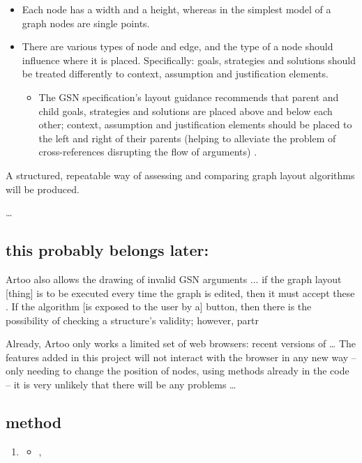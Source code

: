 \begin{itemize}
  \item
    Each node has a width and a height, whereas in the simplest model of a graph nodes are single points. 
  \item
    There are various types of node and edge, and the type of a node should influence where it is placed. Specifically: goals, strategies and solutions should be treated differently to context, assumption and justification elements.
    \begin{itemize}
    \item The GSN specification's layout guidance \citep[section~2.2, pp.~26--27]{gsnstandard} recommends that parent and child goals, strategies and solutions are placed above and below each other; context, assumption and justification elements should be placed to the left and right of their parents (helping to alleviate the problem of cross-references disrupting the flow of arguments) .
    \end{itemize}
\end{itemize}

A structured, repeatable way of assessing and comparing graph layout algorithms will be produced. 

\ldots

\subsection{this probably belongs later:}

Artoo also allows the drawing of invalid GSN arguments ...
if the graph layout [thing] is to be executed every time the graph is edited,  then it must accept these .
If the algorithm [is exposed to the user by a] button, then there is the possibility of checking a structure's validity; however, partr

Already, Artoo only works a limited set of web browsers: recent versions of \ldots
The features added in this project will not interact with the browser in any new way -- only needing to change the position of nodes, using methods already in the code -- it is very unlikely that there will be any problems \ldots

\subsection{method}


  \begin{enumerate}
    \item
      \begin{itemize}
      \item ,
    \end{itemize}
  \end{enumerate}
